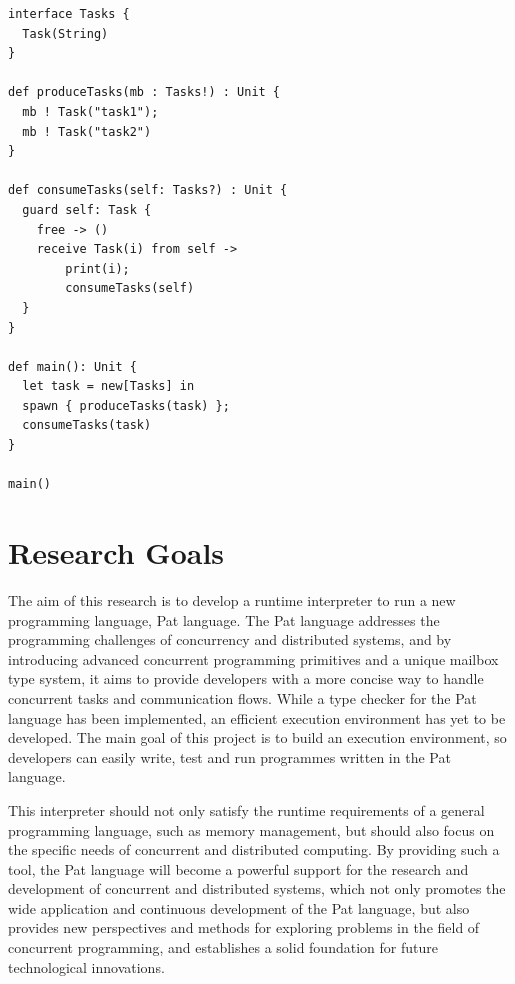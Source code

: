 \documentclass{l4proj}
\begin{document}
\noindent\begin{minipage}{\linewidth}
\lstset{style=patstyle}
\begin{lstlisting}[caption=Pat language example which enforces Task message payloads to be of type String, label={lst:patexample1}]
interface Tasks {
  Task(String)
}

def produceTasks(mb : Tasks!) : Unit {
  mb ! Task("task1");
  mb ! Task("task2")
}

def consumeTasks(self: Tasks?) : Unit {
  guard self: Task {
    free -> ()
    receive Task(i) from self ->
        print(i);
        consumeTasks(self)
  }
}

def main(): Unit {
  let task = new[Tasks] in
  spawn { produceTasks(task) };
  consumeTasks(task)
}

main()
\end{lstlisting}
\end{minipage}

\section{Research Goals}

The aim of this research is to develop a runtime interpreter to run a new programming language, Pat language. The Pat language addresses the programming challenges of concurrency and distributed systems, and by introducing advanced concurrent programming primitives and a unique mailbox type system, it aims to provide developers with a more concise way to handle concurrent tasks and communication flows. While a type checker for the Pat language has been implemented, an efficient execution environment has yet to be developed. The main goal of this project is to build an execution environment, so developers can easily write, test and run programmes written in the Pat language.

This interpreter should not only satisfy the runtime requirements of a general programming language, such as memory management, but should also focus on the specific needs of concurrent and distributed computing. By providing such a tool, the Pat language will become a powerful support for the research and development of concurrent and distributed systems, which not only promotes the wide application and continuous development of the Pat language, but also provides new perspectives and methods for exploring problems in the field of concurrent programming, and establishes a solid foundation for future technological innovations.
\end{document}
